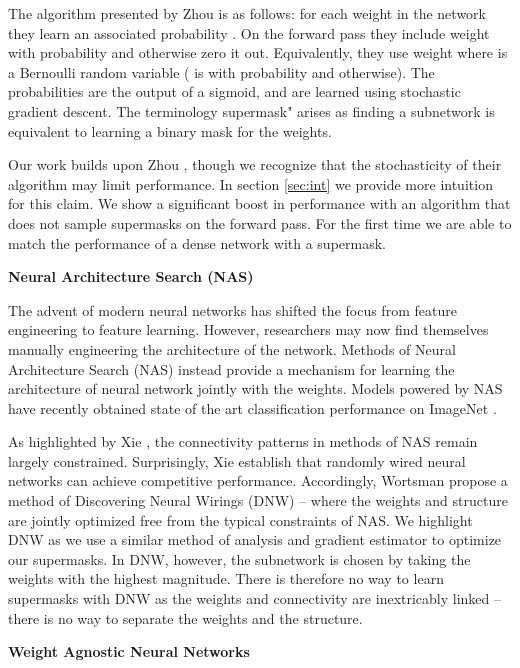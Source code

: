 \documentclass[10pt,twocolumn,letterpaper]{article}
\begin{document}
The algorithm presented by Zhou \etal is as follows: for each weight  in the network they learn an associated probability . On the forward pass they include weight  with probability  and otherwise zero it out. Equivalently, they use weight  where  is a Bernoulli random variable ( is  with probability  and  otherwise). The probabilities  are the output of a sigmoid, and are learned using stochastic gradient descent. The terminology supermask" arises as finding a subnetwork is equivalent to learning a binary mask for the weights.

Our work builds upon Zhou \etal, though we recognize that the stochasticity of their algorithm may limit performance. In section \ref{sec:int} we provide more intuition for this claim. We show a significant boost in performance with an algorithm that does not sample supermasks on the forward pass. For the first time we are able to match the performance of a dense network with a supermask.

\noindent\textbf{Neural Architecture Search (NAS)}

The advent of modern neural networks has shifted the focus from feature engineering to feature learning. However, researchers may now find themselves manually engineering the architecture of the network. Methods of Neural Architecture Search (NAS) \cite{nas, cai2018proxylessnas, liu2018progressive, mnasnet} instead provide a mechanism for learning the architecture of neural network jointly with the weights. Models powered by NAS have recently obtained state of the art classification performance on ImageNet \cite{efficientnet}.

As highlighted by Xie \etal \cite{xie2019exploring}, the connectivity patterns in methods of NAS remain largely constrained. Surprisingly, Xie \etal establish that randomly wired neural networks can achieve competitive performance. Accordingly, Wortsman \etal \cite{dnw} propose a method of Discovering Neural Wirings (DNW) -- where the weights and structure are jointly optimized free from the typical constraints of NAS. We highlight DNW as we use a similar method of analysis and gradient estimator to optimize our supermasks. In DNW, however, the subnetwork is chosen by taking the weights with the highest magnitude. There is therefore no way to learn supermasks with DNW as the weights and connectivity are inextricably linked -- there is no way to separate the weights and the structure.

\noindent\textbf{Weight Agnostic Neural Networks}
\end{document}
